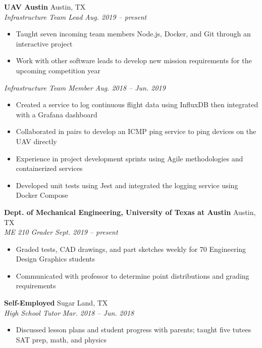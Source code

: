 \documentclass[letterpaper,11pt]{article}
\begin{document}
\textbf{UAV Austin} \hfill Austin, TX\\
\textit{Infrastructure Team Lead} \hfill \textit{Aug. 2019 -- present}\\
\begin{itemize}[noitemsep, topsep=0pt, leftmargin=0.7cm]
  \item Taught seven incoming team members Node.js, Docker, and Git through an interactive project 
  \item Work with other software leads to develop new mission requirements for the upcoming competition year
\end{itemize}
\textit{Infrastructure Team Member} \hfill \textit{Aug. 2018 -- Jun. 2019}\\
\begin{itemize}[noitemsep, topsep=0pt, leftmargin=0.7cm]
  \item Created a service to log continuous flight data using InfluxDB then integrated with a Grafana dashboard
  \item Collaborated in pairs to develop an ICMP ping service to ping devices on the UAV directly
  \item Experience in project development sprints using Agile methodologies and containerized services 
  \item Developed unit tests using Jest and integrated the logging service using Docker Compose
\end{itemize}
\textbf{Dept. of Mechanical Engineering, University of Texas at Austin} \hfill Austin, TX\\
\textit{ME 210 Grader} \hfill \textit{Sept. 2019 -- present}\\
\begin{itemize}[noitemsep, topsep=0pt, leftmargin=0.7cm]
  \item Graded tests, CAD drawings, and part sketches weekly for 70 Engineering Design Graphics students
  \item Communicated with professor to determine point distributions and grading requirements
\end{itemize}
\textbf{Self-Employed} \hfill Sugar Land, TX\\
\textit{High School Tutor} \hfill \textit{Mar. 2018 -- Jun. 2018}\\
\begin{itemize}[noitemsep, topsep=0pt, leftmargin=0.7cm]
  \item Discussed lesson plans and student progress with parents; taught five tutees SAT prep, math, and physics
\end{itemize}
\end{document}
